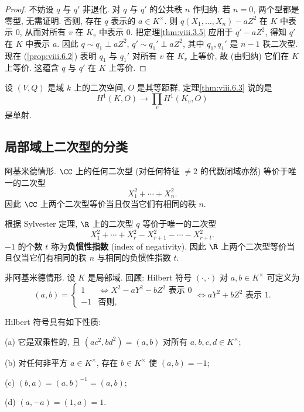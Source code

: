 \begin{proof}
不妨设 $q$ 与 $q'$ 非退化. 对 $q$ 与 $q'$ 的公共秩 $n$ 作归纳. 若 $n=0$, 两个型都是零型, 无需证明. 否则, 存在 $q$ 表示的 $a\in K^{\times}$. 则 $q(X_1,\ldots,X_n)-aZ^{2}$ 在 $K$ 中表示 $0$, 从而对所有 $v$ 在 $K_v$ 中表示 $0$. 把定理\ref{thm:viii.3.5} 应用于 $q'-aZ^{2}$, 得知 $q'$ 在 $K$ 中表示 $a$. 因此 $q\sim q_1\perp aZ^{2}$, $q'\sim q_1'\perp aZ^{2}$, 其中 $q_1,q_1'$ 是 $n-1$ 秩二次型. 现在 (\ref{prop:viii.6.2}) 表明 $q_1$ 与 $q_1'$ 对所有 $v$ 在 $K_v$ 上等价, 故 (由归纳) 它们在 $K$ 上等价. 这蕴含 $q$ 与 $q'$ 在 $K$ 上等价.
\end{proof}

\begin{remark}\label{rem:viii.6.4}
设 $(V,Q)$ 是域 $k$ 上的二次空间, $O$ 是其等距群. 定理\ref{thm:viii.6.3} 说的是
\[
H^{1}(K,O)\to\prod_{v}H^{1}(K_{v},O)
\]
是单射.
\end{remark}

\subsection*{局部域上二次型的分类}

阿基米德情形. $\CC$ 上的任何二次型 (对任何特征 $\ne 2$ 的代数闭域亦然) 等价于唯一的二次型
\[
X_{1}^{2}+\cdots+X_{n}^{2}.
\]
因此 $\CC$ 上两个二次型等价当且仅当它们有相同的秩 $n$.

根据 Sylvester 定理, $\R$ 上的二次型 $q$ 等价于唯一的二次型
\[
X_{1}^{2}+\cdots+X_{r}^{2}-X_{r+1}^{2}-\cdots-X_{r+t}^{2}.
\]
$-1$ 的个数 $t$ 称为\textbf{负惯性指数} (index of negativity). 因此 $\R$ 上两个二次型等价当且仅当它们有相同的秩 $n$ 与相同的负惯性指数 $t$.

非阿基米德情形. 设 $K$ 是局部域. 回顾: Hilbert 符号 $(\cdot,\cdot)$ 对 $a,b\in K^{\times}$ 可定义为
\[
(a,b)=
\begin{cases}
1 & \Longleftrightarrow X^{2}-aY^{2}-bZ^{2} \text{ 表示 } 0\\
-1 & \text{否则,}
\end{cases}
\Longleftrightarrow aY^{2}+bZ^{2} \text{ 表示 } 1.
\]

\begin{lemma}\label{lem:viii.6.5}
Hilbert 符号具有如下性质:

(a) 它是双乘性的, 且 $(ac^{2},bd^{2})=(a,b)$ 对所有 $a,b,c,d\in K^{\times}$;

(b) 对任何非平方 $a\in K^{\times}$, 存在 $b\in K^{\times}$ 使 $(a,b)=-1$;

(c) $(b,a)=(a,b)^{-1}=(a,b)$;

(d) $(a,-a)=(1,a)=1$.
\end{lemma}

